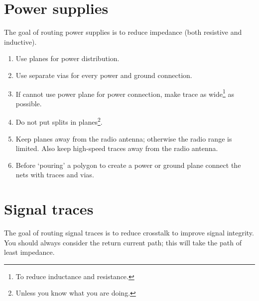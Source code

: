 \section{Power supplies}

The goal of routing power supplies is to reduce impedance (both
resistive and inductive).

\begin{enumerate}

\item Use planes for power distribution.

\item Use separate vias for every power and ground connection.

\item If cannot use power plane for power connection, make trace as
  wide\footnote{To reduce inductance and resistance.} as possible.

\item Do not put splits in planes\footnote{Unless you know what you
  are doing.}.

\item Keep planes away from the radio antenna; otherwise the radio
  range is limited.  Also keep high-speed traces away from the radio
  antenna.

\item Before `pouring' a polygon to create a power or ground plane
  connect the nets with traces and vias.
\end{enumerate}


\section{Signal traces}

The goal of routing signal traces is to reduce crosstalk to improve
signal integrity.  You should always consider the return current path;
this will take the path of least impedance.



